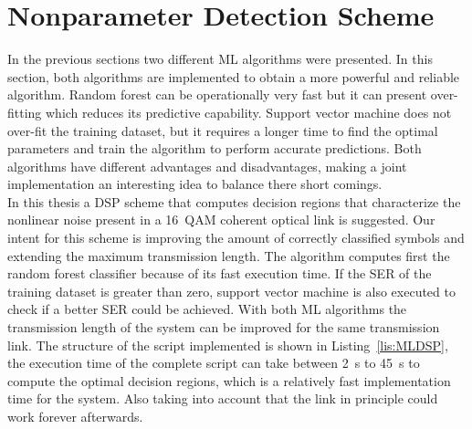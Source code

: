 \section{Nonparameter Detection Scheme  }
In the previous sections two different ML algorithms were presented. In this section, both algorithms are implemented to obtain a more powerful and reliable algorithm. Random forest can be operationally very fast but it can present over-fitting which reduces its predictive capability. Support vector machine does not over-fit the training dataset, but it requires a longer time to find the optimal parameters and train the algorithm to perform accurate predictions. Both algorithms have different advantages and disadvantages, making a joint implementation an interesting idea to balance there short comings.~\\

In this thesis a DSP scheme that computes decision regions that characterize the nonlinear noise present in a 16~QAM coherent optical link is suggested. Our intent for this scheme is improving the amount of correctly classified symbols and  extending the maximum transmission length. The algorithm computes first  the random forest classifier because of its fast execution time. If the SER of the training dataset is greater than zero, support vector machine is also executed to check if a better SER could be achieved. With both  ML algorithms the transmission length of the system can be improved for the same transmission link. The structure of the script implemented is shown in Listing~\ref{lis:MLDSP}, the execution time of the complete script can take between 2~s to 45~s to compute the optimal decision regions, which is a relatively fast implementation time for the system. Also taking into account that the link in principle could work forever afterwards.~\\								    

